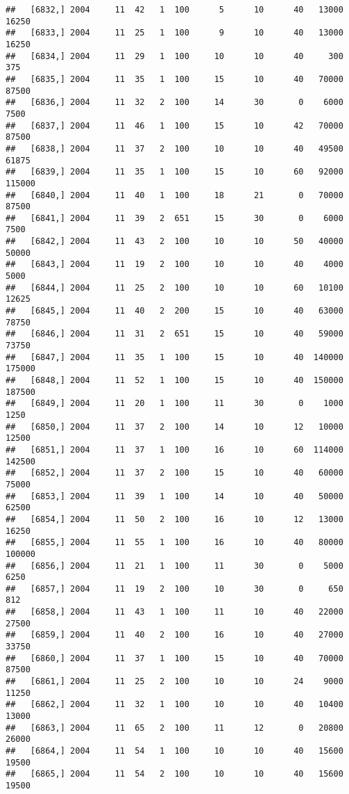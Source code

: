 \documentclass{article}\usepackage[]{graphicx}\usepackage[]{color}
\makeatletter
\newenvironment{kframe}{%
 \def\at@end@of@kframe{}%
 \ifinner\ifhmode%
  \def\at@end@of@kframe{\end{minipage}}%
  \begin{minipage}{\columnwidth}%
 \fi\fi%
 \def\FrameCommand##1{\hskip\@totalleftmargin \hskip-\fboxsep
 \colorbox{shadecolor}{##1}\hskip-\fboxsep
     \hskip-\linewidth \hskip-\@totalleftmargin \hskip\columnwidth}%
 \MakeFramed {\advance\hsize-\width
   \@totalleftmargin\z@ \linewidth\hsize
   \@setminipage}}%
 {\par\unskip\endMakeFramed%
 \at@end@of@kframe}
\newenvironment{knitrout}{}{} %
\makeatother
\begin{document}
\begin{knitrout}
\begin{kframe}
\begin{verbatim}
##   [6832,] 2004     11  42   1  100      5      10      40   13000   16250
##   [6833,] 2004     11  25   1  100      9      10      40   13000   16250
##   [6834,] 2004     11  29   1  100     10      10      40     300     375
##   [6835,] 2004     11  35   1  100     15      10      40   70000   87500
##   [6836,] 2004     11  32   2  100     14      30       0    6000    7500
##   [6837,] 2004     11  46   1  100     15      10      42   70000   87500
##   [6838,] 2004     11  37   2  100     10      10      40   49500   61875
##   [6839,] 2004     11  35   1  100     15      10      60   92000  115000
##   [6840,] 2004     11  40   1  100     18      21       0   70000   87500
##   [6841,] 2004     11  39   2  651     15      30       0    6000    7500
##   [6842,] 2004     11  43   2  100     10      10      50   40000   50000
##   [6843,] 2004     11  19   2  100     10      10      40    4000    5000
##   [6844,] 2004     11  25   2  100     10      10      60   10100   12625
##   [6845,] 2004     11  40   2  200     15      10      40   63000   78750
##   [6846,] 2004     11  31   2  651     15      10      40   59000   73750
##   [6847,] 2004     11  35   1  100     15      10      40  140000  175000
##   [6848,] 2004     11  52   1  100     15      10      40  150000  187500
##   [6849,] 2004     11  20   1  100     11      30       0    1000    1250
##   [6850,] 2004     11  37   2  100     14      10      12   10000   12500
##   [6851,] 2004     11  37   1  100     16      10      60  114000  142500
##   [6852,] 2004     11  37   2  100     15      10      40   60000   75000
##   [6853,] 2004     11  39   1  100     14      10      40   50000   62500
##   [6854,] 2004     11  50   2  100     16      10      12   13000   16250
##   [6855,] 2004     11  55   1  100     16      10      40   80000  100000
##   [6856,] 2004     11  21   1  100     11      30       0    5000    6250
##   [6857,] 2004     11  19   2  100     10      30       0     650     812
##   [6858,] 2004     11  43   1  100     11      10      40   22000   27500
##   [6859,] 2004     11  40   2  100     16      10      40   27000   33750
##   [6860,] 2004     11  37   1  100     15      10      40   70000   87500
##   [6861,] 2004     11  25   2  100     10      10      24    9000   11250
##   [6862,] 2004     11  32   1  100     10      10      40   10400   13000
##   [6863,] 2004     11  65   2  100     11      12       0   20800   26000
##   [6864,] 2004     11  54   1  100     10      10      40   15600   19500
##   [6865,] 2004     11  54   2  100     10      10      40   15600   19500

\end{verbatim}
\end{kframe}
\end{knitrout}
\end{document}
